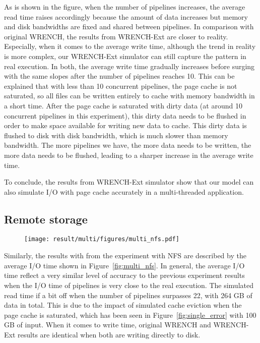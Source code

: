\documentclass[conference]{IEEEtran}
\begin{document}
			As is shown in the figure, when the number of pipelines increases, 
			the average read time raises accordingly because the amount of data 
			increases but memory and disk bandwidths are fixed and shared between pipelines. 
			In comparison with original WRENCH, the results from WRENCH-Ext are closer 
			to reality. 
			Especially, when it comes to the average write time, 
			although the trend in reality is more complex, our WRENCH-Ext 
			simulator can still capture the pattern in real execution.
			In both, the average write time gradually increases before surging with the 
			same slopes after the number of pipelines reaches 10. 
			This can be explained that with less than 10 concurrent pipelines, 
			the page cache is not saturated, so all files can be written entirely to 
			cache with memory bandwidth in a short time. 
			After the page cache is saturated with dirty data (at around 
			10 concurrent pipelines in this experiment), this dirty data needs 
			to be flushed in order to make space available for writing new data to cache. 
			This dirty data is flushed to disk with disk bandwidth, which is much  
			slower than memory bandwidth. 
			The more pipelines we have, the more data needs to be written, the more data 
			needs to be flushed, leading to a sharper increase in the average write time. 
			
			To conclude, the results from WRENCH-Ext simulator show that 
			our model can also simulate I/O with page cache accurately in a 
			multi-threaded application.  
			
		\subsection{Remote storage}
		
			\begin{figure*}		
			\begin{subfigure}{\linewidth}
				\centering
   				\texttt{[image: result/multi/figures/multi\_nfs.pdf]}
			\end{subfigure}		
			\caption{I/O time of concurrent pipelines with NFS}
			\label{fig:multi_nfs}
			\end{figure*}
		
			Similarly, the results with from the experiment with NFS are described 
			by the average I/O time shown in Figure~\ref{fig:multi_nfs}.
			In general, the average I/O time reflect a very similar level of accuracy 
			to the previous experiment results when the I/O time of pipelines 
			is very close to the real execution. 
			The simulated read time if a bit off when the number of pipelines 
			surpasses 22, with 264 GB of data in total. 
			This is due to the impact of simulated cache eviction when 
			the page cache is saturated, which has been seen in 
			Figure~\ref{fig:single_error} with 100 GB of input. 
			When it comes to write time, original WRENCH and WRENCH-Ext 
			results are identical when both are writing directly to disk.
		
\end{document}
